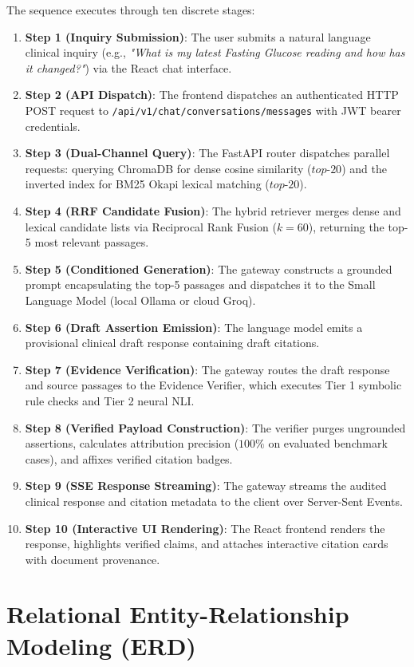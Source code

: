 The sequence executes through ten discrete stages:
\begin{enumerate}
    \item \textbf{Step 1 (Inquiry Submission)}: The user submits a natural language clinical inquiry (e.g., \textit{"What is my latest Fasting Glucose reading and how has it changed?"}) via the React chat interface.
    \item \textbf{Step 2 (API Dispatch)}: The frontend dispatches an authenticated HTTP POST request to \texttt{/api/v1/chat/conversations/messages} with JWT bearer credentials.
    \item \textbf{Step 3 (Dual-Channel Query)}: The FastAPI router dispatches parallel requests: querying ChromaDB for dense cosine similarity ($top\text{-}20$) and the inverted index for BM25 Okapi lexical matching ($top\text{-}20$).
    \item \textbf{Step 4 (RRF Candidate Fusion)}: The hybrid retriever merges dense and lexical candidate lists via Reciprocal Rank Fusion ($k=60$), returning the top-5 most relevant passages.
    \item \textbf{Step 5 (Conditioned Generation)}: The gateway constructs a grounded prompt encapsulating the top-5 passages and dispatches it to the Small Language Model (local Ollama or cloud Groq).
    \item \textbf{Step 6 (Draft Assertion Emission)}: The language model emits a provisional clinical draft response containing draft citations.
    \item \textbf{Step 7 (Evidence Verification)}: The gateway routes the draft response and source passages to the Evidence Verifier, which executes Tier 1 symbolic rule checks and Tier 2 neural NLI.
    \item \textbf{Step 8 (Verified Payload Construction)}: The verifier purges ungrounded assertions, calculates attribution precision ($100\%$ on evaluated benchmark cases), and affixes verified citation badges.
    \item \textbf{Step 9 (SSE Response Streaming)}: The gateway streams the audited clinical response and citation metadata to the client over Server-Sent Events.
    \item \textbf{Step 10 (Interactive UI Rendering)}: The React frontend renders the response, highlights verified claims, and attaches interactive citation cards with document provenance.
\end{enumerate}


\section{Relational Entity-Relationship Modeling (ERD)}
\label{sec:arch_erd}

